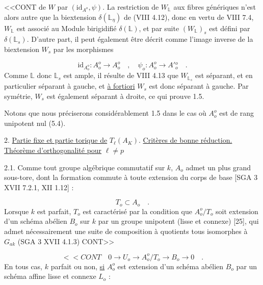 <<CONT de $W$ par $(\mathrm{id}_{A^o} , \psi)$. La restriction de $W_{\mathbb{L}}$ aux fibres génériques n'est alors autre que la biextension $\delta(\mathbb{L}_\eta)$ de (VIII 4.12), donc en vertu de VIII 7.4, $W_{\mathbb{L}}$ est associé au Module birigidifié $\delta(\mathbb{L})$, et par suite $(W_{\mathbb{L}})_s$ est défini par $\delta(\mathbb{L}_s)$. D'autre part, il peut également être décrit comme l'image inverse de la biextension $W_s$ par les morphismes

\begin{equation*}
\mathrm{id}_{A^o_o} : A^o_o \longrightarrow A^o_o \quad , \quad \psi_o : A^o_o \longrightarrow A'{}^o_o \quad .
\end{equation*}
Comme $\mathbb{L}$ donc $\mathbb{L}_s$ est ample, il résulte de VIII 4.13 que $W_{\mathbb{L}_s}$ est séparant, et en particulier séparant à gauche, et \underline{à fortiori} $W_s$ est donc séparant à gauche. Par symétrie, $W_s$ est également séparant à droite, ce qui prouve 1.5.

Notons que nous préciserons considérablement 1.5 dans le cas où $A^o_o$ est de rang unipotent nul (5.4).


2. \underline{Partie fixe et partie torique de} $T_\ell(A_K)$. \underline{Critères de bonne réduction.} \underline{Théorème d'orthogonalité pour} $\ell \neq p$

2.1.  Comme tout groupe algébrique commutatif sur $k$, $A_o$ admet un plus grand sous-tore, dont la formation commute à toute extension du corps de base [SGA 3 XVII 7.2.1, XII 1.12] :

\begin{equation}\tag{2.1.1}
T_o \subset A_o \quad .
\end{equation}
Lorsque $k$ est parfait, $T_o$ est caractérisé par la condition que $A^o_o/T_o$ soit extension d'un schéma abélien $B_o$ sur $k$ par un groupe unipotent (lisse et connexe) [25], qui admet nécessairement une suite de composition à quotients tous isomorphes à $G_{ak}$ (SGA 3 XVII 4.1.3) CONT>>



\begin{equation}\tag{2.1.2}
<<CONT\quad 0 \longrightarrow U_o \longrightarrow A_o^o/T_o \longrightarrow B_o \longrightarrow 0 \quad .
\end{equation}
En tous cas, $k$ parfait ou non, \underline{si} $A_o^o$ est extension d'un schéma abélien $B_o$ par un schéma affine lisse et connexe $L_o$ :


